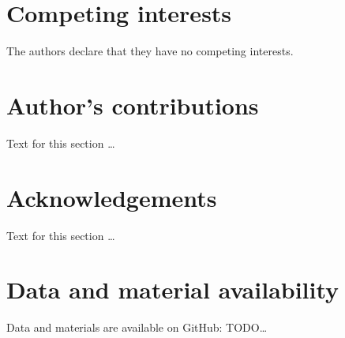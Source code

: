\documentclass[twocolumn]{bmcart}%
\begin{document}
\begin{backmatter}

\section*{Competing interests}
  The authors declare that they have no competing interests.

\section*{Author's contributions}
    Text for this section \ldots

\section*{Acknowledgements}
  Text for this section \ldots

\section*{Data and material availability}
  Data and materials are available on GitHub:
  TODO\ldots




\end{backmatter}
\end{document}
